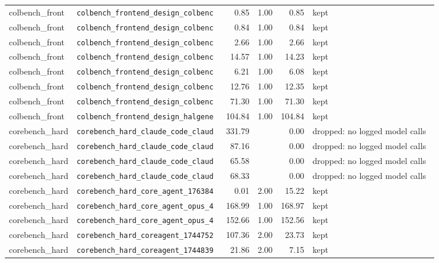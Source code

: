 {\begin{longtable}{llrrrl}
colbench\_front & \texttt{\scriptsize colbench\_frontend\_design\_colbenc~} & 0.85 & 1.00 & 0.85 & kept \\
colbench\_front & \texttt{\scriptsize colbench\_frontend\_design\_colbenc~} & 0.84 & 1.00 & 0.84 & kept \\
colbench\_front & \texttt{\scriptsize colbench\_frontend\_design\_colbenc~} & 2.66 & 1.00 & 2.66 & kept \\
colbench\_front & \texttt{\scriptsize colbench\_frontend\_design\_colbenc~} & 14.57 & 1.00 & 14.23 & kept \\
colbench\_front & \texttt{\scriptsize colbench\_frontend\_design\_colbenc~} & 6.21 & 1.00 & 6.08 & kept \\
colbench\_front & \texttt{\scriptsize colbench\_frontend\_design\_colbenc~} & 12.76 & 1.00 & 12.35 & kept \\
colbench\_front & \texttt{\scriptsize colbench\_frontend\_design\_colbenc~} & 71.30 & 1.00 & 71.30 & kept \\
colbench\_front & \texttt{\scriptsize colbench\_frontend\_design\_halgene~} & 104.84 & 1.00 & 104.84 & kept \\
corebench\_hard & \texttt{\scriptsize corebench\_hard\_claude\_code\_claud~} & 331.79 &  & 0.00 & dropped: no logged model calls~ \\
corebench\_hard & \texttt{\scriptsize corebench\_hard\_claude\_code\_claud~} & 87.16 &  & 0.00 & dropped: no logged model calls~ \\
corebench\_hard & \texttt{\scriptsize corebench\_hard\_claude\_code\_claud~} & 65.58 &  & 0.00 & dropped: no logged model calls~ \\
corebench\_hard & \texttt{\scriptsize corebench\_hard\_claude\_code\_claud~} & 68.33 &  & 0.00 & dropped: no logged model calls~ \\
corebench\_hard & \texttt{\scriptsize corebench\_hard\_core\_agent\_176384~} & 0.01 & 2.00 & 15.22 & kept \\
corebench\_hard & \texttt{\scriptsize corebench\_hard\_core\_agent\_opus\_4~} & 168.99 & 1.00 & 168.97 & kept \\
corebench\_hard & \texttt{\scriptsize corebench\_hard\_core\_agent\_opus\_4~} & 152.66 & 1.00 & 152.56 & kept \\
corebench\_hard & \texttt{\scriptsize corebench\_hard\_coreagent\_1744752~} & 107.36 & 2.00 & 23.73 & kept \\
corebench\_hard & \texttt{\scriptsize corebench\_hard\_coreagent\_1744839~} & 21.86 & 2.00 & 7.15 & kept \\

\end{longtable}}

